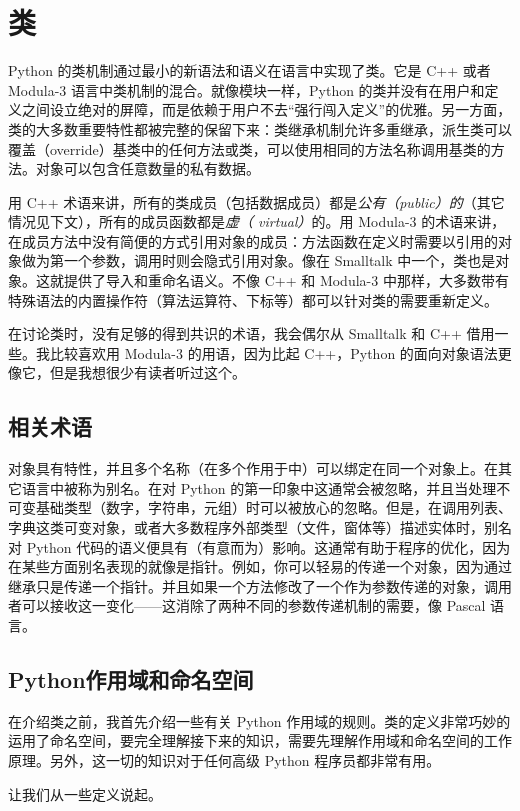 \chapter{类\label{Class}}
Python 的类机制通过最小的新语法和语义在语言中实现了类。它是 C++ 或者 Modula-3 语言中类机制的混合。就像模块一样，Python 的类并没有在用户和定义之间设立绝对的屏障，而是依赖于用户不去“强行闯入定义”的优雅。另一方面，类的大多数重要特性都被完整的保留下来：类继承机制允许多重继承，派生类可以覆盖（override）基类中的任何方法或类，可以使用相同的方法名称调用基类的方法。对象可以包含任意数量的私有数据。

用 C++ 术语来讲，所有的类成员（包括数据成员）都是\textit{公有（public）的}（其它情况见下文），所有的成员函数都是\textit{虚（ virtual）}的。用 Modula-3 的术语来讲，在成员方法中没有简便的方式引用对象的成员：方法函数在定义时需要以引用的对象做为第一个参数，调用时则会隐式引用对象。像在 Smalltalk 中一个，类也是对象。这就提供了导入和重命名语义。不像 C++ 和 Modula-3 中那样，大多数带有特殊语法的内置操作符（算法运算符、下标等）都可以针对类的需要重新定义。

在讨论类时，没有足够的得到共识的术语，我会偶尔从 Smalltalk 和 C++ 借用一些。我比较喜欢用 Modula-3 的用语，因为比起 C++，Python 的面向对象语法更像它，但是我想很少有读者听过这个。
\section{相关术语\label{Class:WordNameObject}}
对象具有特性，并且多个名称（在多个作用于中）可以绑定在同一个对象上。在其它语言中被称为别名。在对 Python 的第一印象中这通常会被忽略，并且当处理不可变基础类型（数字，字符串，元组）时可以被放心的忽略。但是，在调用列表、字典这类可变对象，或者大多数程序外部类型（文件，窗体等）描述实体时，别名对 Python 代码的语义便具有（有意而为）影响。这通常有助于程序的优化，因为在某些方面别名表现的就像是指针。例如，你可以轻易的传递一个对象，因为通过继承只是传递一个指针。并且如果一个方法修改了一个作为参数传递的对象，调用者可以接收这一变化——这消除了两种不同的参数传递机制的需要，像 Pascal 语言。
\section{Python作用域和命名空间}
在介绍类之前，我首先介绍一些有关 Python 作用域的规则。类的定义非常巧妙的运用了命名空间，要完全理解接下来的知识，需要先理解作用域和命名空间的工作原理。另外，这一切的知识对于任何高级 Python 程序员都非常有用。

让我们从一些定义说起。

